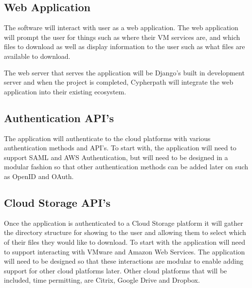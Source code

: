 \documentclass{article}
\begin{document}

        \subsection{Web Application}
        The software will interact with user as a web application. The web application will prompt the user for things such as
        where their VM services are, and which files to download as well as display information to the user such as what files are available to download.

        The web server that serves the application will be Django's built in development server and when the project is completed, Cypherpath will integrate
        the web application into their existing ecosystem.

        
        \subsection{Authentication API's}
        The application will authenticate to the cloud platforms with various authentication methods and API's. To start with, the application will need to support
        SAML and AWS Authentication, but will need to be designed in a modular fashion so that other authentication methods can be added later on such as OpenID and OAuth.


        \subsection{Cloud Storage API's}
        Once the application is authenticated to a Cloud Storage platform it will gather the directory structure for showing to the user and allowing them to select
        which of their files they would like to download. To start with the application will need to support interacting with VMware and Amazon Web Services. The application will
        need to be designed so that these interactions are modular to enable adding support for other cloud platforms later. Other cloud platforms that will be included, time permitting,
        are Citrix, Google Drive and Dropbox.
\end{document}
